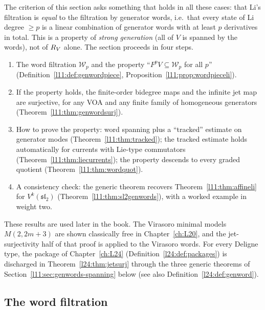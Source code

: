The criterion of this section asks something that holds in all these cases: that Li's filtration is
\emph{equal} to the filtration by generator words, i.e.\ that every state of Li degree $\ge p$ is a linear
combination of generator words with at least $p$ derivatives in total. This is a property of \emph{strong
generation} (all of $V$ is spanned by the words), not of $R_V$ alone. The section proceeds in four steps.
\begin{enumerate}
\item The word filtration $\mathcal W_p$ and the property ``$F^pV\subseteq \mathcal W_p$ for all $p$''
  (Definition~\ref{l11:def:genwordpiece}, Proposition~\ref{l11:prop:wordpieceli}).
\item If the property holds, the finite-order bidegree maps and the infinite jet map are surjective, for any
  VOA and any finite family of homogeneous generators (Theorem~\ref{l11:thm:genwordsurj}).
\item How to prove the property: word spanning plus a ``tracked'' estimate on generator modes
  (Theorem~\ref{l11:thm:tracked}); the tracked estimate holds automatically for currents with Lie-type
  commutators (Theorem~\ref{l11:thm:liecurrents}); the property descends to every graded quotient
  (Theorem~\ref{l11:thm:wordquot}).
\item A consistency check: the generic theorem recovers Theorem~\ref{l11:thm:affineli} for
  $V^k(\mathfrak{sl}_2)$ (Theorem~\ref{l11:thm:sl2genwords}), with a worked example in weight two.
\end{enumerate}
These results are used later in the book. The Virasoro minimal models $M(2,2m+3)$ are shown classically free in
Chapter~\ref{ch:L20}, and the jet-surjectivity half of that proof is
\allowbreak{}\allowbreak{}\allowbreak{}
applied to the Virasoro words. For every Deligne type, the package  of
Chapter~\ref{ch:L24} (Definition~\ref{l24:def:packages}) is discharged in Theorem~\ref{l24:thm:jetsurj} through
the three generic theorems of Section~\ref{l11:sec:genwords-spanning} below (see also
Definition~\ref{l24:def:genword}).

\subsection{The word filtration}\label{l11:sec:genwords-filtration}

